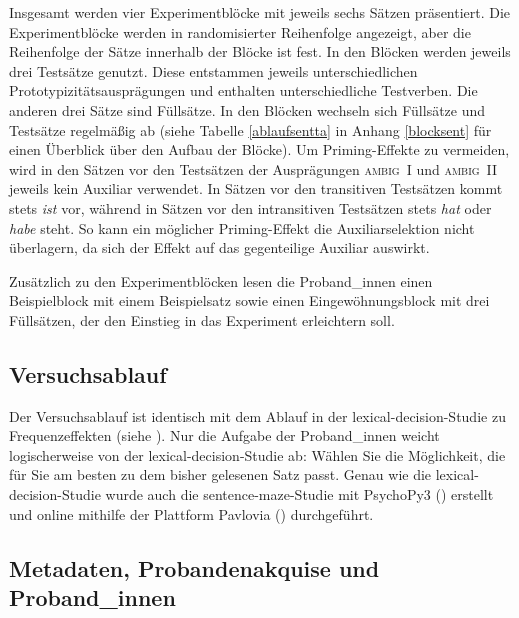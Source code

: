 Insgesamt werden vier Experimentblöcke mit jeweils sechs Sätzen präsentiert. Die Experimentblöcke werden in randomisierter Reihenfolge angezeigt, aber die Reihenfolge der Sätze innerhalb der Blöcke ist fest. In den Blöcken werden jeweils drei Testsätze genutzt. Diese entstammen jeweils unterschiedlichen Prototypizitätsausprägungen und enthalten unterschiedliche Testverben. Die anderen drei Sätze sind Füllsätze. In den Blöcken wechseln sich Füllsätze und Testsätze regelmäßig ab (siehe Tabelle \ref{ablaufsentta} in Anhang \ref{blocksent} für einen Überblick über den Aufbau der Blöcke). Um Priming-Effekte zu vermeiden, wird in den Sätzen vor den Testsätzen der Ausprägungen \textsc{ambig~I} und \textsc{ambig~II} jeweils kein Auxiliar verwendet. In Sätzen vor den transitiven Testsätzen kommt stets \textit{ist} vor, während in Sätzen vor den intransitiven Testsätzen stets \textit{hat} oder \textit{habe} steht. So kann ein möglicher Priming-Effekt die Auxiliarselektion nicht überlagern, da sich der Effekt auf das gegenteilige Auxiliar auswirkt. 


Zusätzlich zu den Experimentblöcken lesen die Proband\_innen einen Beispielblock mit einem Beispielsatz sowie einen Eingewöhnungsblock mit drei Füllsätzen, der den Einstieg in das Experiment erleichtern soll.  
 
\subsection{Versuchsablauf}

Der Versuchsablauf ist identisch mit dem Ablauf in der lexical-decision-Studie zu Frequenzeffekten (siehe ). Nur die Aufgabe der Proband\_innen weicht logischerweise von der lexical-decision-Studie ab: Wählen Sie die Möglichkeit, die für Sie am besten zu dem bisher gelesenen Satz passt. Genau wie die lexical-decision-Studie wurde auch die sentence-maze-Studie mit PsychoPy3 (\cite{Peirce.2019}) erstellt und  online mithilfe der Plattform Pavlovia (\cite{PsychoPyTeam.2019}) durchgeführt.

\subsection{Metadaten, Probandenakquise und Proband\_innen}
\label{probprototy}


